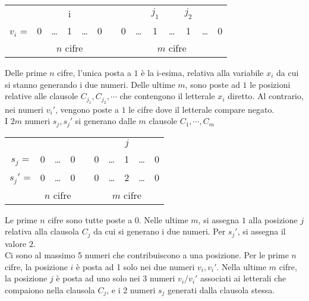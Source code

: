 \begin{center}
    \begin{tabular}[h]{*{14}{c}}
                &   &        & i &        &   &        &   &        &$j_1$&        &$j_2$&        &    \\
       \cline{2-14}
        $v_i$ = & 0 & \ldots & 1 & \ldots & 0 & \vline & 0 & \ldots & 1   & \ldots & 1   & \ldots & 0  \\
       \cline{2-14}
                & \multicolumn{5}{c}{$n$ cifre}&\vline & \multicolumn{7}{c}{$m$ cifre}
    \end{tabular}
\end{center}
Delle prime $n$ cifre, l'unica posta a $1$ è la i-esima, relativa alla variabile $x_i$ da cui si stanno generando i due numeri. Delle ultime $m$, sono poste ad $1$ le posizioni relative alle clausole $C_{j_1}, C_{j_2}, \cdots$ che contengono il letterale $x_i$ diretto. Al contrario, nei numeri $v_i'$, vengono poste a $1$ le cifre dove il letterale compare negato.
\\
I $2m$ numeri $s_j, s_j'$ si generano dalle $m$ clausole $C_1, \cdots, C_m$
\begin{center}
    \begin{tabular}[h]{*{10}{c}}
                &   &        &   &        &   &        &$j$ &        &     \\
       \cline{2-10}
        $s_j$ = & 0 & \ldots & 0 & \vline & 0 & \ldots & 1  & \ldots &  0  \\
       $s_j'$ = & 0 & \ldots & 0 & \vline & 0 & \ldots & 2  & \ldots &  0  \\
       \cline{2-10}
                & \multicolumn{3}{c}{$n$ cifre}
                                 & \vline & \multicolumn{5}{c}{$m$ cifre}
    \end{tabular}
\end{center}
Le prime $n$ cifre sono tutte poste a $0$. Nelle ultime $m$, si assegna $1$ alla posizione $j$ relativa alla clausola $C_j$ da cui si generano i due numeri. Per $s_j'$, si assegna il valore $2$.
\\
Ci sono al massimo 5 numeri che contribuiscono a una posizione.
Per le prime $n$ cifre, la posizione $i$ è posta ad 1 solo nei due numeri $v_i, v_i'$.
Nella ultime $m$ cifre, la posizione $j$ è posta ad uno solo nei 3 numeri $v_i / v_i'$ associati ai letterali che compaiono nella clausola $C_j$, e i 2 numeri $s_j$ generati dalla clausola stessa.
